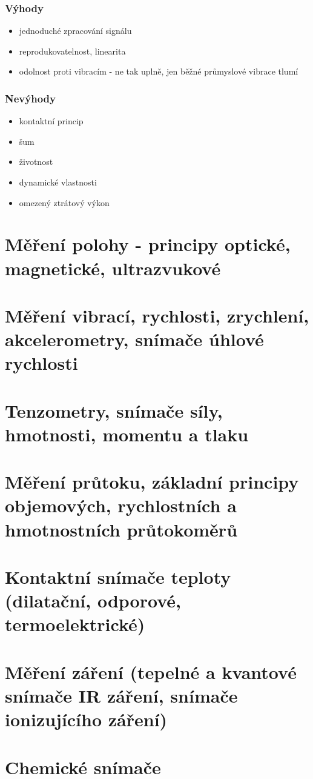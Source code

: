 \subsubsection{Výhody}
\begin{itemize}
    \item jednoduché zpracování signálu
    \item reprodukovatelnost, linearita
    \item odolnost proti vibracím - ne tak uplně, jen běžné průmyslové vibrace tlumí
\end{itemize}
\subsubsection{Nevýhody}
\begin{itemize}
    \item kontaktní princip
    \item šum
    \item životnost
    \item dynamické vlastnosti
    \item omezený ztrátový výkon
\end{itemize}

\section{Měření polohy - principy optické, magnetické, ultrazvukové}


\section{Měření vibrací, rychlosti, zrychlení, akcelerometry, snímače úhlové rychlosti }


\section{Tenzometry, snímače síly, hmotnosti, momentu a tlaku }


\section{Měření průtoku, základní principy objemových, rychlostních a hmotnostních průtokoměrů}


\section{Kontaktní snímače teploty (dilatační, odporové, termoelektrické)}


\section{Měření záření (tepelné a kvantové snímače IR záření, snímače ionizujícího záření)}


\section{Chemické snímače}